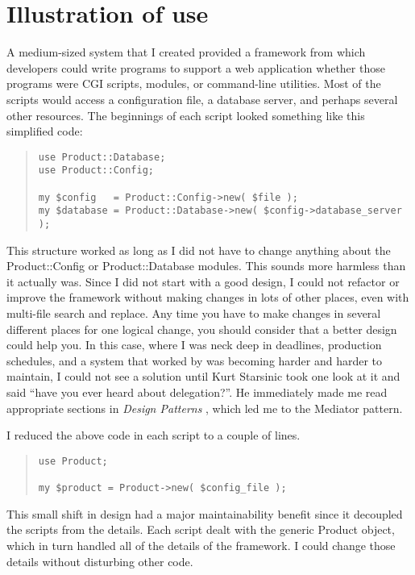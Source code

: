     \section{Illustration of use}

A medium-sized system that I created provided a framework from which 
developers could write programs to support a web application whether
those programs were CGI scripts, \modperl modules, or command-line
utilities.  Most of the scripts would access a configuration file,
a database server, and perhaps several other resources.  The beginnings
of each script looked something like this simplified code:

\begin{quote}    
\begin{verbatim}
use Product::Database;
use Product::Config;

my $config   = Product::Config->new( $file );
my $database = Product::Database->new( $config->database_server );
\end{verbatim}
\end{quote}    

This structure worked as long as I did not have to change anything
about the Product::Config or Product::Database modules.  This sounds
more harmless than it actually was.  Since I did not start with a good
design, I could not refactor or improve the framework without making
changes in lots of other places, even with multi-file search and replace.
Any time you have to make changes in
several different places for one logical change, you should consider that
a better design could help you.  In this case, where I was neck deep in 
deadlines, production schedules, and a system that worked by was becoming harder
and harder to maintain, I could not see a solution until Kurt Starsinic 
took one look at it and said ``have you ever heard about delegation?''.  He
immediately made me read appropriate sections in { \it Design Patterns }, which 
led me to the Mediator pattern.  

I reduced the above code in each script to a couple of lines.

\begin{quote}    
\begin{verbatim}
use Product;

my $product = Product->new( $config_file );

\end{verbatim}
\end{quote}    

This small shift in design had a major maintainability benefit since it
decoupled the scripts from the details.  Each script dealt with the
generic Product object, which in turn handled all of the details of the
framework. I could change those details without disturbing other code.

